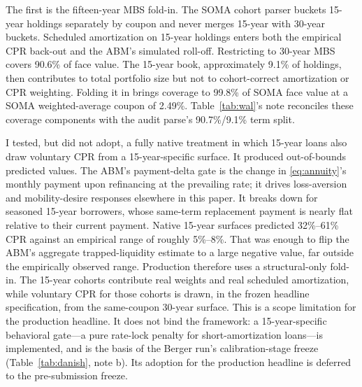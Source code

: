 \documentclass[12pt]{article}
\begin{document}
The first is the fifteen-year MBS fold-in. The SOMA cohort parser buckets 15-year holdings separately by coupon and never merges 15-year with 30-year buckets. Scheduled amortization on 15-year holdings enters both the empirical CPR back-out and the ABM's simulated roll-off. Restricting to 30-year MBS covers 90.6\% of face value. The 15-year book, approximately 9.1\% of holdings, then contributes to total portfolio size but not to cohort-correct amortization or CPR weighting. Folding it in brings coverage to 99.8\% of SOMA face value at a SOMA weighted-average coupon of 2.49\%. Table~\ref{tab:wal}'s note reconciles these coverage components with the audit parse's 90.7\%/9.1\% term split.

I tested, but did not adopt, a fully native treatment in which 15-year loans also draw voluntary CPR from a 15-year-specific surface. It produced out-of-bounds predicted values. The ABM's payment-delta gate is the change in \eqref{eq:annuity}'s monthly payment upon refinancing at the prevailing rate; it drives loss-aversion and mobility-desire responses elsewhere in this paper. It breaks down for seasoned 15-year borrowers, whose same-term replacement payment is nearly flat relative to their current payment. Native 15-year surfaces predicted 32\%--61\% CPR against an empirical range of roughly 5\%--8\%. That was enough to flip the ABM's aggregate trapped-liquidity estimate to a large negative value, far outside the empirically observed range. Production therefore uses a structural-only fold-in. The 15-year cohorts contribute real weights and real scheduled amortization, while voluntary CPR for those cohorts is drawn, in the frozen headline specification, from the same-coupon 30-year surface. This is a scope limitation for the production headline. It does not bind the framework: a 15-year-specific behavioral gate---a pure rate-lock penalty for short-amortization loans---is implemented, and is the basis of the Berger run's calibration-stage freeze (Table~\ref{tab:danish}, note b). Its adoption for the production headline is deferred to the pre-submission freeze.
\end{document}
